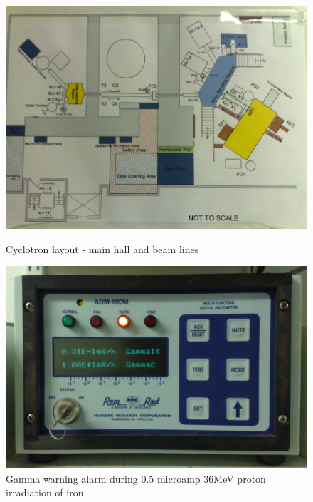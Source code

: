 \begin{figure}[htp]
  \begin{center}
    \includegraphics[width=\linewidth]{chapters/activity_code/images/cyclotron_layout.png}
    \caption{Cyclotron layout - main hall and beam lines}
    \label{fig:cyclotronlayout}
  \end{center}
	\endminipage\hfill
  \begin{center}
    \includegraphics[width=\linewidth]{chapters/activity_code/images/gamma_warning.png}
    \caption{Gamma warning alarm during 0.5 microamp 36MeV proton irradiation of iron }
    \label{fig:gammawarning}
  \end{center}
	\endminipage\hfill  
\end{figure}

